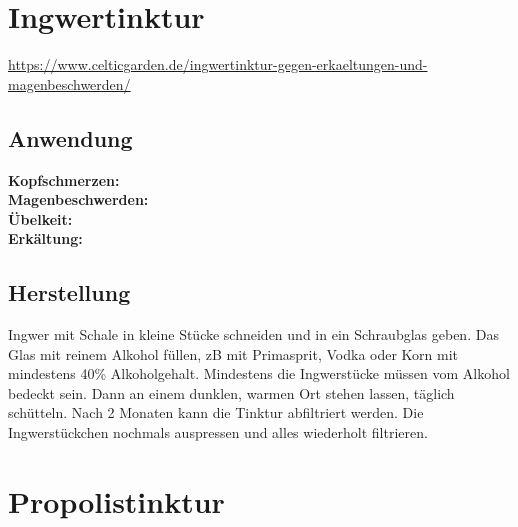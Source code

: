 


\newpage


\section{Ingwertinktur}


\url{https://www.celticgarden.de/ingwertinktur-gegen-erkaeltungen-und-magenbeschwerden/}

   

\subsection{Anwendung}
\textbf{Kopfschmerzen:} \\ 

\textbf{Magenbeschwerden:} \\ 

\textbf{Übelkeit:} \\ 

\textbf{Erkältung:} \\ 


\subsection{Herstellung}

Ingwer mit Schale in kleine Stücke schneiden und in ein Schraubglas geben. Das Glas mit reinem Alkohol füllen, zB mit Primasprit, Vodka oder Korn mit mindestens 40\% Alkoholgehalt. Mindestens die Ingwerstücke müssen vom Alkohol bedeckt sein. Dann an einem dunklen, warmen Ort stehen lassen, täglich schütteln. Nach 2 Monaten kann die Tinktur abfiltriert werden. Die Ingwerstückchen nochmals auspressen und alles wiederholt filtrieren.




\newpage



\section{Propolistinktur}

